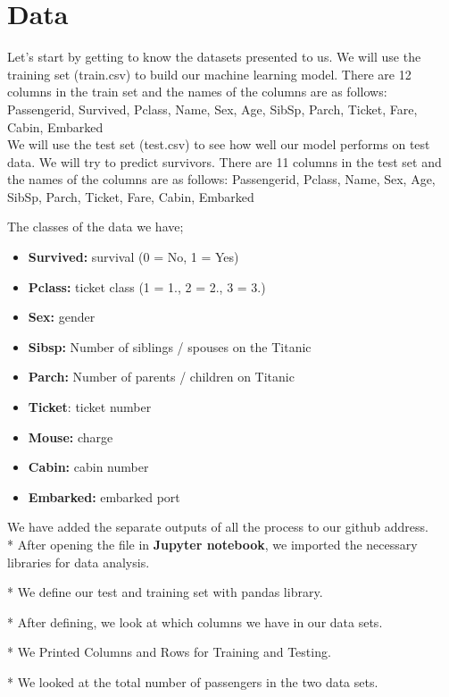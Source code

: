 \documentclass[onecolumn]{article}
\begin{document}
\section{Data}

Let's start by getting to know the datasets presented to us.
We will use the training set (train.csv) to build our machine learning model. There are 12 columns in the train set and the names of the columns are as follows:\\
Passengerid, Survived, Pclass, Name, Sex, Age, SibSp, Parch, Ticket, Fare, Cabin, Embarked\\
We will use the test set (test.csv) to see how well our model performs on test data. We will try to predict survivors.
There are 11 columns in the test set and the names of the columns are as follows:
Passengerid, Pclass, Name, Sex, Age, SibSp, Parch, Ticket, Fare, Cabin, Embarked

The classes of the data we have;
\begin{itemize}

\item \textbf{Survived:} survival (0 = No, 1 = Yes)
\item \textbf{Pclass:} ticket class (1 = 1., 2 = 2., 3 = 3.)
\item \textbf{Sex:} gender
\item \textbf{Sibsp:} Number of siblings / spouses on the Titanic
\item \textbf{Parch:} Number of parents / children on Titanic
\item \textbf{Ticket}: ticket number
\item \textbf{Mouse:} charge
\item \textbf{Cabin:} cabin number
\item \textbf{Embarked:} embarked port
\end{itemize}

We have added the separate outputs of all the process  to our github address.\\
* After opening the file in \textbf{Jupyter notebook}, we imported the necessary libraries for data analysis.

* We define our test and training set with pandas library.

* After defining, we look at which columns we have in our data sets.

* We Printed Columns and Rows for Training and Testing.

* We looked at the total number of passengers in the two data sets.
\end{document}
